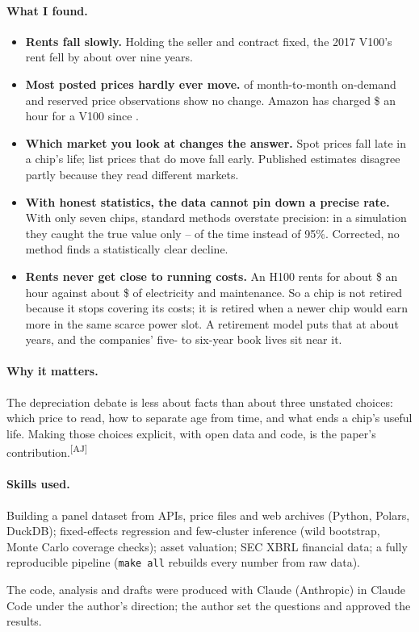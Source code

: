 \documentclass[11pt]{article}
\newif\ifajfinal
\newcommand{\ajcheck}[1]{\ifajfinal#1\else{\color{blue!60!black}#1}\textsuperscript{\color{red}[AJ]}\fi}
\begin{document}
\paragraph{What I found.}
\begin{itemize}
\item \textbf{Rents fall slowly.} Holding the seller and contract fixed, the 2017 V100's rent
fell by about \nPathVHundredNinePct{} over nine years.
\item \textbf{Most posted prices hardly ever move.} \nListUnchanged{} of month-to-month on-demand
and reserved price observations show no change. Amazon has charged \$\nAwsVHundredPrice{} an hour
for a V100 since \nAwsVHundredFirstYear{}.
\item \textbf{Which market you look at changes the answer.} Spot prices fall late in a chip's
life; list prices that do move fall early. Published estimates disagree partly because they read
different markets.
\item \textbf{With honest statistics, the data cannot pin down a precise rate.} With only seven
chips, standard methods overstate precision: in a simulation they caught the true value
only \nCovWcuLo--\nCovWcuHi{} of the time instead of 95\%. Corrected, no method finds a
statistically clear decline.
\item \textbf{Rents never get close to running costs.} An H100 rents for about
\$\nValRentNow{} an hour against about \$\nValOpex{} of electricity and maintenance. So a chip is
not retired because it stops covering its costs; it is retired when a newer chip would earn more
in the same scarce power slot. A retirement model puts that at about \nPThreeMedian{} years, and
the companies' five- to six-year book lives sit near it.
\end{itemize}

\paragraph{Why it matters.} \ajcheck{The depreciation debate is less about facts than about three
unstated choices: which price to read, how to separate age from time, and what ends a chip's
useful life. Making those choices explicit, with open data and code, is the paper's contribution.}

\paragraph{Skills used.} Building a panel dataset from APIs, price files and web archives (Python,
Polars, DuckDB); fixed-effects regression and few-cluster inference (wild bootstrap, Monte Carlo
coverage checks); asset valuation; SEC XBRL financial data; a fully reproducible pipeline
(\texttt{make all} rebuilds every number from raw data).

{\footnotesize The code, analysis and drafts were produced with Claude (Anthropic) in Claude Code
under the author's direction; the author set the questions and approved the results.}
\end{document}
